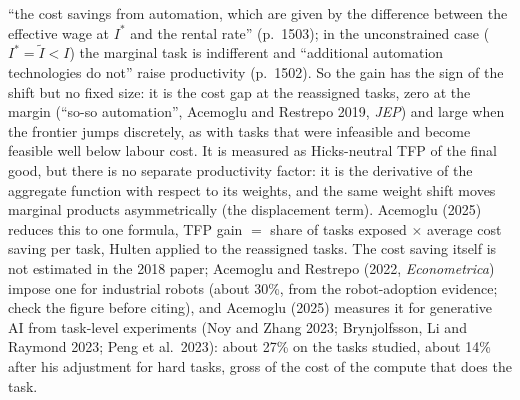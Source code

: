 \documentclass[11pt]{article}
\begin{document}
``the cost savings from automation, which are given by the difference between the effective wage at $I^*$ and the rental rate'' (p.~1503); in the unconstrained case ($I^*=\tilde I<I$) the marginal task is indifferent and ``additional automation technologies do not'' raise productivity (p.~1502). So the gain has the sign of the shift but no fixed size: it is the cost gap at the reassigned tasks, zero at the margin (``so-so automation'', Acemoglu and Restrepo 2019, \emph{JEP}) and large when the frontier jumps discretely, as with tasks that were infeasible and become feasible well below labour cost. It is measured as Hicks-neutral TFP of the final good, but there is no separate productivity factor: it is the derivative of the aggregate function with respect to its weights, and the same weight shift moves marginal products asymmetrically (the displacement term). Acemoglu (2025) reduces this to one formula, TFP gain $=$ share of tasks exposed $\times$ average cost saving per task, Hulten applied to the reassigned tasks. The cost saving itself is not estimated in the 2018 paper; Acemoglu and Restrepo (2022, \emph{Econometrica}) impose one for industrial robots (about 30\%, from the robot-adoption evidence; check the figure before citing), and Acemoglu (2025) measures it for generative AI from task-level experiments (Noy and Zhang 2023; Brynjolfsson, Li and Raymond 2023; Peng et al.\ 2023): about 27\% on the tasks studied, about 14\% after his adjustment for hard tasks, gross of the cost of the compute that does the task.
\end{document}
